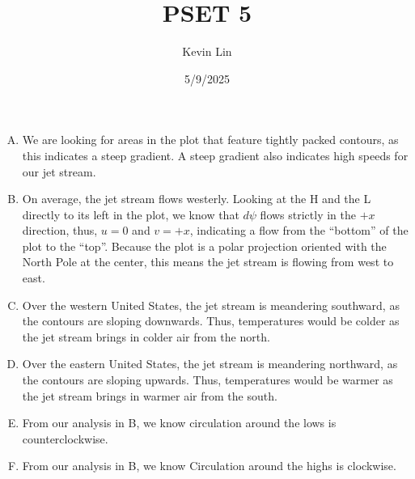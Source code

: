 \documentclass[11pt,a4paper,margin=1in]{article}
\title{PSET 5}
\author{Kevin Lin}
\date{5/9/2025}
\begin{document}
\maketitle
\section{}
\begin{enumerate}[A.]
    \item 
    We are looking for areas in the plot that feature tightly packed contours,
    as this indicates a steep gradient. A steep gradient also indicates high speeds
    for our jet stream.
    \item 
    On average, the jet stream flows westerly. Looking at the H and the L directly 
    to its left in the plot, we know that $d\psi$ flows strictly in the $+x$ direction, 
    thus, $u = 0$ and $v = +x$, indicating a flow from the ``bottom'' of the plot
    to the ``top''. Because the plot is a polar projection oriented with the North 
    Pole at the center, this means the jet stream is flowing from west to east. 
    \item 
    Over the western United States, the jet stream is meandering southward, as
    the contours are sloping downwards. Thus, temperatures would be colder as 
    the jet stream brings in colder air from the north.
    \item 
    Over the eastern United States, the jet stream is meandering northward, as
    the contours are sloping upwards. Thus, temperatures would be warmer as
    the jet stream brings in warmer air from the south.
    \item 
    From our analysis in B, we know circulation around the lows is counterclockwise.
    \item 
    From our analysis in B, we know Circulation around the highs is clockwise.
\end{enumerate}
\end{document}
